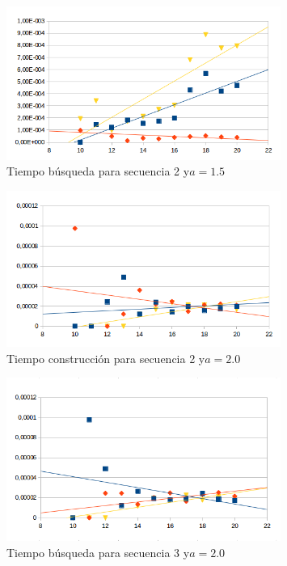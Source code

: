 \documentclass[letterpaper,12pt]{article}
\begin{document}
\begin{figure}[bp!]
  \centering
    \includegraphics[width=0.8\textwidth]{freq215_busq}
  \caption{Tiempo b\'usqueda para secuencia 2 y$a=1.5$}
  \label{fig:f4}
\end{figure}

\begin{figure}[bp!]
  \centering
    \includegraphics[width=0.8\textwidth]{freq320_ins}
  \caption{Tiempo construcción para secuencia 2 y$a=2.0$}
  \label{fig:f5}
\end{figure}

\begin{figure}[bp!]
  \centering
    \includegraphics[width=0.8\textwidth]{freq320_busq}
  \caption{Tiempo b\'usqueda para secuencia 3 y$a=2.0$}
  \label{fig:f6}
\end{figure}
\fi
\newpage
\end{document}
